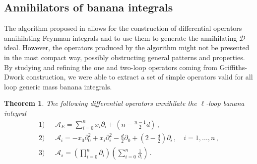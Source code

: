 \documentclass[11pt]{article}
\newtheorem{theorem}{Theorem}
\begin{document}
\subsection{Annihilators of banana integrals}
The algorithm proposed in \cite{Chestnov:2025whi} allows for the construction of differential operators annihilating Feynman integrals and to use them to generate the annihilating $\mathcal{D}$-ideal. However, the operators produced by the algorithm might not be presented in the most compact way, possibly obstructing general patterns and properties. By studying and refining the one and two-loop operators coming from Griffiths-Dwork construction, we were able to extract a set of simple operators valid for all loop generic mass banana integrals.  
\begin{theorem}\label{prop:operators}
The following differential operators annihilate the $\ell$-loop banana integral
\begin{align}
1) \,\,\,\, &\mathcal{A}_{E} = \sum_{i=0}^{n} x_{i}\partial_{i} + \left(n - \frac{n-1}{2}d \right) \,, \\
2) \,\,\,\, &\mathcal{A}_{i} = - x_{0}\partial_{0}^{2} + x_{i} \partial_{i}^{2} -\frac{d}{2} \partial_{0} + \left(2-\frac{d}{2} \right)\partial_{i}    \,, \quad  i=1, \ldots , n \,, \\
3) \,\,\,\, &\mathcal{A}_{s} = \left( \prod_{i=0}^{n} \partial_{i} \right) \left( \sum_{i=0}^{n} \frac{1}{\partial_{i}} \right)  \,.  
\end{align}
\end{theorem}
\end{document}
